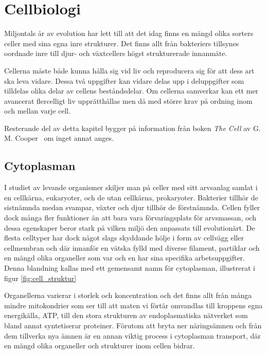 \chapter{Cellbiologi}

Miljontals år av evolution har lett till att det idag finns en mängd olika sorters celler med sina egna inre strukturer. Det finns allt från bakteriers tillsynes oordnade inre till djur- och växtcellers högst strukturerade innanmäte. 

Cellerna måste både kunna hålla sig vid liv och reproducera sig för att dess art ska leva vidare. Dessa två uppgifter kan vidare delas upp i deluppgifter som tilldelas olika delar av cellens beståndsdelar. Om cellerna samverkar kan ett mer avancerat flercelligt liv upprätthållas men då med större krav på ordning inom och mellan varje cell.

Resterande del av detta kapitel bygger på information från boken \emph{The Cell} av G. M.  Cooper~\cite{Cooper_TheCell2000} om inget annat anges.


\section{Cytoplasman}
I studiet av levande organismer skiljer man på celler med sitt arvsanlag samlat i en cellkärna, eukaryoter, och de utan cellkärna, prokaryoter. Bakterier tillhör de sistnämnda medan svampar, växter och djur tillhör de förstnämnda. Cellen fyller dock många fler funktioner än att bara vara förvaringsplats för arvsmassan, och dessa egenskaper beror stark på vilken miljö den anpassats till evolutionärt. De flesta celltyper har dock något slags skyddande hölje i form av cellvägg eller cellmembran och där innanför en vätska fylld med diverse filament, partiklar och en mängd olika organeller som var och en har sina specifika arbetsuppgifter. Denna blandning kallas med ett gemensamt namn för cytoplasman, illustrerat i figur \ref{fig:cell_struktur}

Organellerna varierar i storlek och koncentration och det finns allt från många mindre mitokondrier som ser till att maten vi förtär omvandlas till kroppens egna energikälla, ATP, till den stora strukturen av endoplasmatiska nätverket som bland annat syntetiserar proteiner. Förutom att bryta ner näringsämnen och från dem tillverka nya ämnen är en annan viktig process i cytoplasman transport, där en mängd olika organeller och strukturer inom cellen bidrar.


